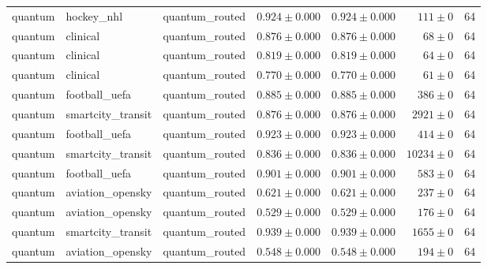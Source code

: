 \begin{table}[htbp]
\begin{tabular}{l l l r r r r}
quantum & hockey\_nhl & quantum\_routed & $0.924\pm0.000$ & $0.924\pm0.000$ & $111\pm0$ & 64 \\
quantum & clinical & quantum\_routed & $0.876\pm0.000$ & $0.876\pm0.000$ & $68\pm0$ & 64 \\
quantum & clinical & quantum\_routed & $0.819\pm0.000$ & $0.819\pm0.000$ & $64\pm0$ & 64 \\
quantum & clinical & quantum\_routed & $0.770\pm0.000$ & $0.770\pm0.000$ & $61\pm0$ & 64 \\
quantum & football\_uefa & quantum\_routed & $0.885\pm0.000$ & $0.885\pm0.000$ & $386\pm0$ & 64 \\
quantum & smartcity\_transit & quantum\_routed & $0.876\pm0.000$ & $0.876\pm0.000$ & $2921\pm0$ & 64 \\
quantum & football\_uefa & quantum\_routed & $0.923\pm0.000$ & $0.923\pm0.000$ & $414\pm0$ & 64 \\
quantum & smartcity\_transit & quantum\_routed & $0.836\pm0.000$ & $0.836\pm0.000$ & $10234\pm0$ & 64 \\
quantum & football\_uefa & quantum\_routed & $0.901\pm0.000$ & $0.901\pm0.000$ & $583\pm0$ & 64 \\
quantum & aviation\_opensky & quantum\_routed & $0.621\pm0.000$ & $0.621\pm0.000$ & $237\pm0$ & 64 \\
quantum & aviation\_opensky & quantum\_routed & $0.529\pm0.000$ & $0.529\pm0.000$ & $176\pm0$ & 64 \\
quantum & smartcity\_transit & quantum\_routed & $0.939\pm0.000$ & $0.939\pm0.000$ & $1655\pm0$ & 64 \\
quantum & aviation\_opensky & quantum\_routed & $0.548\pm0.000$ & $0.548\pm0.000$ & $194\pm0$ & 64 \\
\hline
\end{tabular}
\end{table}
